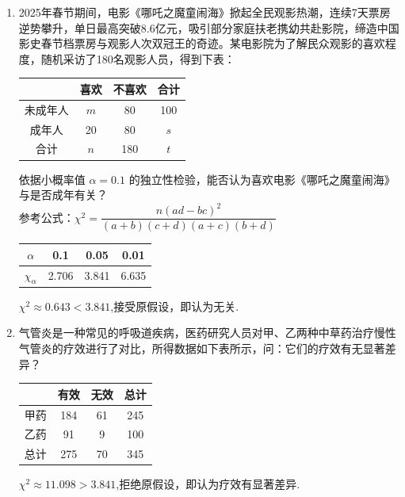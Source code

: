\begin{enumerate}
\item 2025年春节期间，电影《哪吒之魔童闹海》掀起全民观影热潮，连续7天票房逆势攀升，单日最高突破8.6亿元，吸引部分家庭扶老携幼共赴影院，缔造中国影史春节档票房与观影人次双冠王的奇迹。某电影院为了解民众观影的喜欢程度，随机采访了180名观影人员，得到下表：
\begin{center}
\begin{tabular}{|c|c|c|c|}
\hline
 & 喜欢 & 不喜欢 & 合计 \\
\hline
未成年人 & $m$ & 80 & 100 \\
\hline
成年人 & 20 & 80 & $s$ \\
\hline
合计 & $n$ & 180 & $t$ \\
\hline
\end{tabular}
\end{center}
依据小概率值 $\alpha=0.1$ 的独立性检验，能否认为喜欢电影《哪吒之魔童闹海》与是否成年有关？\\
参考公式：$\chi^{2}=\dfrac{n(ad-bc)^{2}}{(a+b)(c+d)(a+c)(b+d)}$
\begin{center}
\begin{tabular}{|c|c|c|c|}
\hline
$\alpha$ & 0.1 & 0.05 & 0.01 \\
\hline
$\chi_{\alpha}$ & 2.706 & 3.841 & 6.635 \\
\hline
\end{tabular}
\end{center}
\begin{jieda}
    $\chi^2\approx 0.643< 3.841$,接受原假设，即认为无关.
\end{jieda}

\item 气管炎是一种常见的呼吸道疾病，医药研究人员对甲、乙两种中草药治疗慢性气管炎的疗效进行了对比，所得数据如下表所示，问：它们的疗效有无显著差异？
\begin{center}
\begin{tabular}{|c|c|c|c|}
\hline
 & 有效 & 无效 & 总计 \\
\hline
甲药 & 184 & 61 & 245 \\
\hline
乙药 & 91 & 9 & 100 \\
\hline
总计 & 275 & 70 & 345 \\
\hline
\end{tabular}
\end{center}
\begin{jieda}
    $\chi^2\approx 11.098> 3.841$,拒绝原假设，即认为疗效有显著差异.
\end{jieda}


\end{enumerate}
